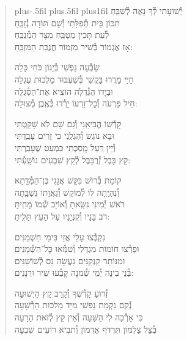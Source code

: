 \documentclass[twoside, openany, parskip=half, 11pt]{book}
\begin{document}
\begin{quote}
\leftskip=0pt plus-.5fil
\rightskip=0pt plus.5fil
\parfillskip=0pt plus1fil
יְ֯שׁוּעָתִי \hfill לְ֯ךָ נָאֶה לְ֯שַׁבֵּֽחַ \\ תִּכּוֹן בֵּית תְּ֯פִלָּתִי \hfill וְ֯שָׁם תּוֹדָה נְ֯זַבֵּֽחַ \\
לְ֯עֵת תָּכִין מַטְבֵּֽחַ \hfill מִצָּר הַמְ֯נַבֵּֽחַ \\ אָז אֶגְמוֹר בְּ֯שִׁיר מִזְמוֹר \hfill חֲנֻכַּת הַמִּזְבֵּֽחַ:

שָׂבְ֯עָה נַפְשִׁי \hfill בְּ֯יָגוֹן כֹּחִי כָּלָה \\ חַיַּי מֵרֲרוּ בָּקֳשִׁי \hfill בְּ֯שִׁעְבּוּד מַלְכוּת עֶגְלָה \\
וּבְיָדוֹ הַגְּ֯דֻלָּה \hfill הוֹצִיא אֶת־הַסְּ֯גֻלָּה \\ חֵיל פַּרְעֹה וְ֯כׇל־זַרְעוֹ \hfill יָרְ֯דוּ כְּ֯אֶֽבֶן מְ֯צוּלָה:

קָדְ֯שׁוֹ הֱבִיאַֽנִי \hfill וְ֯גַם שָׁם לֹא שָׁקַֽטְתִּי \\ וּבָא נוֹגֵשׂ וְ֯הִגְלַֽנִי \hfill כִּי זָרִים עָבַֽדְתִּי \\
וְ֯יֵין רַֽעַל מָֽסַכְתִּי \hfill כִּמְעַט שֶׁעָבַֽרְתִּי \\ קֵץ בָּבֶל זְ֯רֻבָּבֶל \hfill לְ֯קֵץ שִׁבְעִים נוֹשָֽׁעְ֯תִּי:

קוֹמַת בְּ֯רוֹשׁ בִּקֵּשׁ \hfill אֲגָגִי בֶּן־הַמְּ֯דָֽתָא \\ וְ֯נִהְיָֽתָה לּוֹ לְ֯מוֹקֵשׁ \hfill וְ֯גַאֲוָתוֹ נִשְׁבָּֽתָה \\
רֹאשׁ יְ֯מִינִי נִשֵּֽׂאתָ \hfill וְ֯אוֹיֵב שְׁ֯מוֹ מָחִֽיתָ \\ רֹב בָּנָיו וְ֯קִנְיָנָיו \hfill עַל הָעֵץ תָּלִֽיתָ:

נִקְבְּ֯צוּ עָלַי \hfill אֲזַי בִּימֵי חַשְׁמַנִּים \\ וּפָרְ֯צוּ חוֹמוֹת מִגְדָּלַי \hfill וְ֯טִמְּ֯אוּ כׇּל־הַשְּׁ֯מָנִים \\
וּמִנּוֹתַר קַנְקַנִּים \hfill נַעֲשָׂה נֵס לְ֯שׁוֹשַׁנִּים \\ בְּ֯נֵי בִינָה יְ֯מֵי שְׁ֯מֹנָה \hfill קָבְ֯עוּ שִׁיר וּרְנָנִים:


זְ֯רוֹעַ קָדְ֯שֶׁךָ \hfill וְ֯קָרֵב קֵץ הַיְשׁוּעָה\\
נְ֯קֹם נִקְמַת נַפשִׁי \hfill מִיַּד מַלכוּת הָרְ֯שָׁעָה\\
כִּי אָרְ֯כָה לִי הַשָּׁעָה \hfill וְ֯אֵין קֵץ לְ֯זׂאת הָרָעָה\\
בְּ֯צֵל צַלְמוֹן תִּרְדּׂף אַדְמוֹן \hfill וְ֯תבִיא רוֹעִים שִׁבְעָה

\end{quote}
\end{document}
